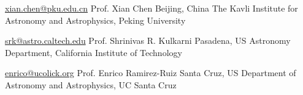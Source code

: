 


\begin{cvreferences}
	
\cvreference
	{\href{mailto:xian.chen@pku.edu.cn}{\faEnvelope\acvHeaderIconSep xian.chen@pku.edu.cn}} %
	{Prof. Xian Chen} %
	{Beijing, China} %
	{The Kavli Institute for Astronomy and Astrophysics, Peking University} %
	
	
	
\cvreference
{\href{mailto:srk@astro.caltech.edu}{\faEnvelope\acvHeaderIconSep srk@astro.caltech.edu}} %
{Prof. Shrinivas R. Kulkarni} %
{Pasadena, US} %
{Astronomy Department, California Institute of Technology} %


	
\cvreference
{\href{mailto:enrico@ucolick.org}{\faEnvelope\acvHeaderIconSep enrico@ucolick.org}} %
{Prof. Enrico Ramirez-Ruiz} %
{Santa Cruz, US} %
{Department of Astronomy and Astrophysics, UC Santa Cruz} %


\end{cvreferences}